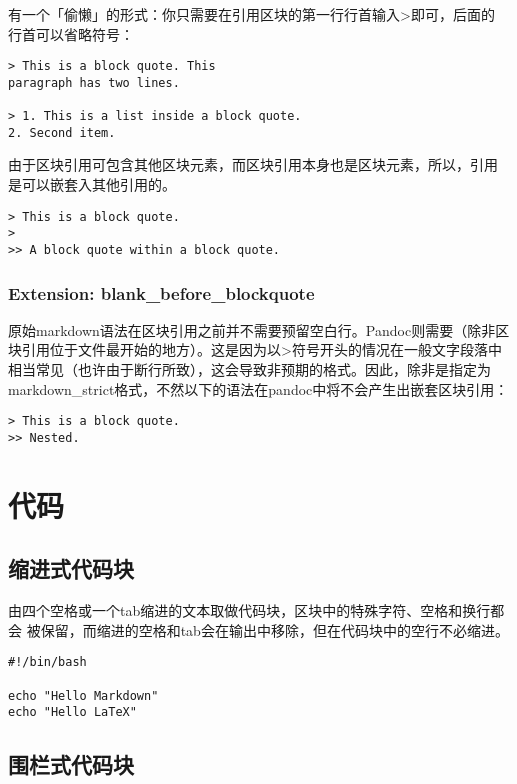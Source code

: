 \documentclass[fancyhdr,bookmark]{ctexbook}
\begin{document}
有一个「偷懒」的形式：你只需要在引用区块的第一行行首输入\textgreater{}即可，后面的
行首可以省略符号：

\begin{lstlisting}
> This is a block quote. This
paragraph has two lines.

> 1. This is a list inside a block quote.
2. Second item.
\end{lstlisting}

由于区块引用可包含其他区块元素，而区块引用本身也是区块元素，所以，引用
是可以嵌套入其他引用的。

\begin{lstlisting}
> This is a block quote.
>
>> A block quote within a block quote.
\end{lstlisting}

\subsubsection{Extension:
blank\_before\_blockquote}\label{extension-blank_before_blockquote}

原始markdown语法在区块引用之前并不需要预留空白行。Pandoc则需要（除非区
块引用位于文件最开始的地方）。这是因为以\textgreater{}符号开头的情况在一般文字段落中
相当常见（也许由于断行所致），这会导致非预期的格式。因此，除非是指定为
markdown\_strict格式，不然以下的语法在pandoc中将不会产生出嵌套区块引用：

\begin{lstlisting}
> This is a block quote.
>> Nested.
\end{lstlisting}

\section{代码}\label{ux4ee3ux7801}

\subsection{缩进式代码块}\label{ux7f29ux8fdbux5f0fux4ee3ux7801ux5757}

由四个空格或一个tab缩进的文本取做代码块，区块中的特殊字符、空格和换行都会
被保留，而缩进的空格和tab会在输出中移除，但在代码块中的空行不必缩进。

\begin{lstlisting}
#!/bin/bash

echo "Hello Markdown"
echo "Hello LaTeX"
\end{lstlisting}

\subsection{围栏式代码块}\label{ux56f4ux680fux5f0fux4ee3ux7801ux5757}
\end{document}
